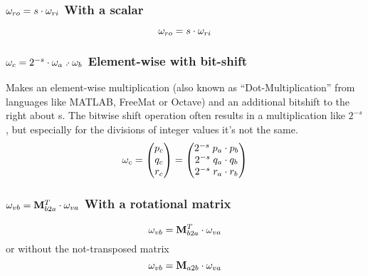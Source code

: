\subsubsection*{$\ra{ro} = s \multiplication \ra{ri}$ With a scalar}
\begin{equation}
\ra{ro} = s \multiplication \ra{ri}
\end{equation}

\subsubsection*{$\ra c = 2^{-s} \multiplication \ra a \ew \multiplication \ra b$ Element-wise with bit-shift}
Makes an element-wise multiplication (also known as ``Dot-Multiplication'' from languages like MATLAB, FreeMat or Octave) and an additional bitshift to the right about s. The bitwise shift operation often results in a multiplication like $2^{-s}$, but especially for the divisions of integer values it's not the same.
\begin{equation}
\ra c = \begin{pmatrix}p_c\\q_c\\r_c\end{pmatrix} = 
\begin{pmatrix}
2^{-s} \; p_a \multiplication p_b \\
2^{-s} \; q_a \multiplication q_b \\
2^{-s} \; r_a \multiplication r_b
\end{pmatrix}
\end{equation}

\subsubsection*{$ \ra {vb} = \transp{\mat M_{b2a}} \multiplication \ra {va}$ With a rotational matrix}
\begin{equation}
\ra {vb} = \transp{\mat M_{b2a}} \multiplication \ra {va}
\end{equation}
or without the not-transposed matrix
\begin{equation}
\ra {vb} = \mat M_{a2b} \multiplication \ra {va}
\end{equation}



